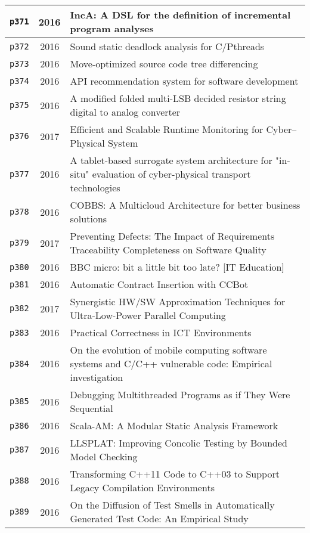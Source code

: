 \begin{longtable}{| c | c | p{16cm} |}
  \hline
  \texttt{p371} & 2016 & IncA: A DSL for the definition of incremental program analyses \\
  \hline
  \texttt{p372} & 2016 & Sound static deadlock analysis for C/Pthreads \\
  \hline
  \texttt{p373} & 2016 & Move-optimized source code tree differencing \\
  \hline
  \texttt{p374} & 2016 & API recommendation system for software development \\
  \hline
  \texttt{p375} & 2016 & A modified folded multi-LSB decided resistor string digital to analog converter \\
  \hline
  \texttt{p376} & 2017 & Efficient and Scalable Runtime Monitoring for Cyber--Physical System \\
  \hline
  \texttt{p377} & 2016 & A tablet-based surrogate system architecture for "in-situ" evaluation of cyber-physical transport technologies \\
  \hline
  \texttt{p378} & 2016 & COBBS: A Multicloud Architecture for better business solutions \\
  \hline
  \texttt{p379} & 2017 & Preventing Defects: The Impact of Requirements Traceability Completeness on Software Quality \\
  \hline
  \texttt{p380} & 2016 & BBC micro: bit a little bit too late? [IT Education] \\
  \hline
  \texttt{p381} & 2016 & Automatic Contract Insertion with CCBot \\
  \hline
  \texttt{p382} & 2017 & Synergistic HW/SW Approximation Techniques for Ultra-Low-Power Parallel Computing \\
  \hline
  \texttt{p383} & 2016 & Practical Correctness in ICT Environments \\
  \hline
  \texttt{p384} & 2016 & On the evolution of mobile computing software systems and C/C++ vulnerable code: Empirical investigation \\
  \hline
  \texttt{p385} & 2016 & Debugging Multithreaded Programs as if They Were Sequential \\
  \hline
  \texttt{p386} & 2016 & Scala-AM: A Modular Static Analysis Framework \\
  \hline
  \texttt{p387} & 2016 & LLSPLAT: Improving Concolic Testing by Bounded Model Checking \\
  \hline
  \texttt{p388} & 2016 & Transforming C++11 Code to C++03 to Support Legacy Compilation Environments \\
  \hline
  \texttt{p389} & 2016 & On the Diffusion of Test Smells in Automatically Generated Test Code: An Empirical Study \\

\end{longtable}

